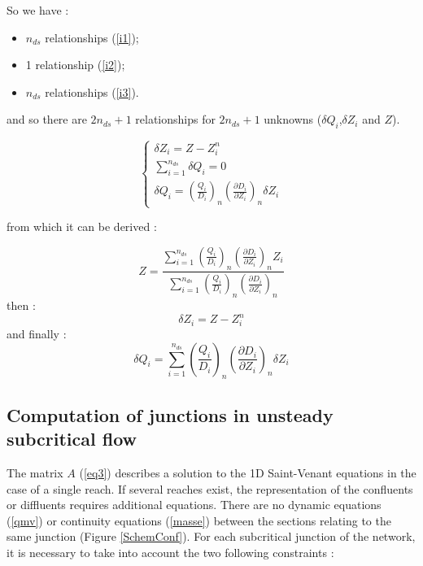So we have :
\begin{itemize}
 \item $n_{ds}$ relationships (\ref{i1});
 \item 1 relationship (\ref{i2});
 \item $n_{ds}$ relationships (\ref{i3}).
\end{itemize}
and so there are $2n_{ds}+1$ relationships for $2n_{ds}+1$ unknowns ($\delta Q_i$,$\delta Z_i$ and $Z$).

\begin{equation}
 \left \lbrace
  \begin{array}{l}
    \delta Z_i = Z - Z_{i}^n \\
    \sum_{i=1}^{n_{ds}} \delta Q_i = 0 \\
    \delta Q_i = \left ( \frac{Q_i}{D_i} \right )_n \left ( \frac{\partial D_i}{\partial Z_i} \right )_n \delta Z_i
  \end{array}
 \right.
\end{equation}

from which it can be derived :

\begin{equation}
  Z = \frac{\displaystyle \sum_{i=1}^{n_{ds}} \left ( \frac{Q_i}{D_i} \right )_n \left ( \frac{\partial D_i}{\partial Z_i} \right )_n Z_i}{\displaystyle \sum_{i=1}^{n_{ds}} \left ( \frac{Q_i}{D_i} \right )_n \left ( \frac{\partial D_i}{\partial Z_i} \right )_n}
\end{equation}
then :
\begin{equation}
  \delta Z_i = Z - Z_{i}^n
\end{equation}
and finally :
\begin{equation}
  \delta Q_i = \sum_{i=1}^{n_{ds}} \left ( \frac{Q_i}{D_i} \right )_n \left ( \frac{\partial D_i}{\partial Z_i} \right )_n \delta Z_i
\end{equation}


\subsection{Computation of junctions in unsteady subcritical flow} \label{NDRezo}

The matrix $A$ (\ref{eq3}) describes a solution to the 1D Saint-Venant equations in the case of a single reach. If several reaches exist, the representation of the confluents or diffluents requires additional equations. There are no dynamic equations (\ref{qmv}) or continuity equations (\ref{masse}) between the sections relating to the same junction (Figure \ref{SchemConf}). For each subcritical junction of the network, it is necessary to take into account the two following constraints :

